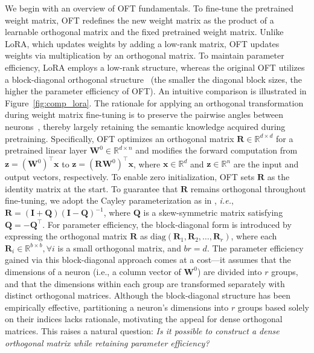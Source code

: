 We begin with an overview of OFT fundamentals. To fine-tune the pretrained weight matrix, OFT redefines the new weight matrix as the product of a learnable orthogonal matrix and the fixed pretrained weight matrix. Unlike LoRA, which updates weights by adding a low-rank matrix, OFT updates weights via multiplication by an orthogonal matrix. To maintain parameter efficiency, LoRA employs a low-rank structure, whereas the original OFT utilizes a block-diagonal orthogonal structure~\cite{qiu2023controlling} (the smaller the diagonal block sizes, the higher the parameter efficiency of OFT). An intuitive comparison is illustrated in Figure~\ref{fig:comp_lora}. The rationale for applying an orthogonal transformation during weight matrix fine-tuning is to preserve the pairwise angles between neurons~\cite{liu2018learning,liu2021orthogonal,qiu2023controlling}, thereby largely retaining the semantic knowledge acquired during pretraining. Specifically, OFT optimizes an orthogonal matrix $\bm{R}\in\mathbb{R}^{d\times d}$ for a pretrained linear layer $\bm{W}^0\in\mathbb{R}^{d\times n}$ and modifies the forward computation from $\bm{z}=(\bm{W}^0)^\top \bm{x}$ to $\bm{z}=(\bm{R}\bm{W}^0)^\top \bm{x}$, where $\bm{x}\in\mathbb{R}^d$ and $\bm{z}\in\mathbb{R}^n$ are the input and output vectors, respectively. To enable zero initialization, OFT sets $\bm{R}$ as the identity matrix at the start. To guarantee that $\bm{R}$ remains orthogonal throughout fine-tuning, we adopt the Cayley parameterization as in \cite{qiu2023controlling,liu2021orthogonal}, \emph{i.e.}, $\bm{R}=(\bm{I}+\bm{Q})(\bm{I}-\bm{Q})^{-1}$, where $\bm{Q}$ is a skew-symmetric matrix satisfying $\bm{Q}=-\bm{Q}^\top$. For parameter efficiency, the block-diagonal form is introduced by expressing the orthogonal matrix $\bm{R}$ as $\text{diag}(\bm{R}_1, \bm{R}_2, \ldots, \bm{R}_r)$, where each $\bm{R}_i\in\mathbb{R}^{b\times b}, \forall i$ is a small orthogonal matrix, and $br=d$. The parameter efficiency gained via this block-diagonal approach comes at a cost—it assumes that the dimensions of a neuron (i.e., a column vector of $\bm{W}^0$) are divided into $r$ groups, and that the dimensions within each group are transformed separately with distinct orthogonal matrices. Although the block-diagonal structure has been empirically effective, partitioning a neuron's dimensions into $r$ groups based solely on their indices lacks rationale, motivating the appeal for dense orthogonal matrices. This raises a natural question: \emph{Is it possible to construct a dense orthogonal matrix while retaining parameter efficiency?}

